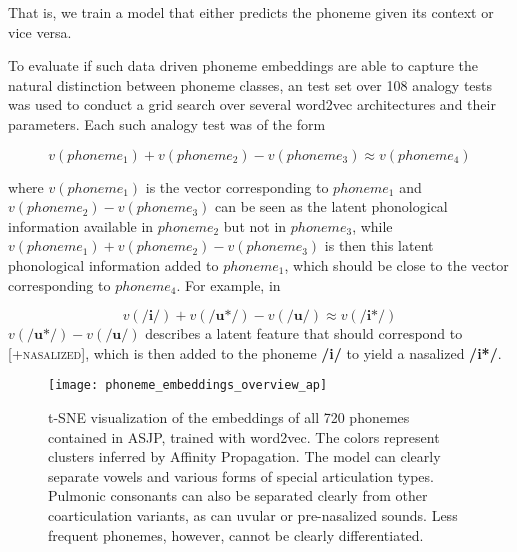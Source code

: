\documentclass[8pt]{article}
\begin{document}
That is, we train a model that either predicts the phoneme given its context or vice versa.  


To evaluate if such data driven phoneme embeddings are able to capture the natural distinction between phoneme classes, an test set over 108 analogy tests was used to conduct a grid search over several word2vec architectures and their parameters. Each such analogy test was of the form

\begin{equation}
v(phoneme_1) + v(phoneme_2) -  v(phoneme_3) \approx v(phoneme_4)
\end{equation} 

where $v(phoneme_1)$ is the vector corresponding to $phoneme_1$ and $v(phoneme_2) - v(phoneme_3)$ can be seen as the latent phonological information available in $phoneme_2$ but not in $phoneme_3$,  while $v(phoneme_1) + v(phoneme_2) -  v(phoneme_3) $ is then this latent phonological information added to $phoneme_1$, which should be close to the vector corresponding to $phoneme_4$. For example, in

\begin{equation}
v(\textbf{/i/} ) + v(\textbf{/u*/} ) -  v(\textbf{/u/} ) \approx v(\textbf{/i*/} )
\end{equation}
$v(\textbf{/u*/} ) -  v(\textbf{/u/} )$ describes a latent feature that should correspond to \textsc{[+nasalized]}, which is then added to the phoneme \textbf{/i/} to yield a nasalized \textbf{/i*/}.

\begin{figure}[h]
\begin{center}
\texttt{[image: phoneme\_embeddings\_overview\_ap]} 
\caption{t-SNE visualization of the embeddings of all 720 phonemes contained in ASJP, trained with word2vec. The colors represent clusters inferred by Affinity Propagation. The model can clearly separate vowels and various forms of special articulation types. Pulmonic consonants can also be separated clearly from other coarticulation variants, as can uvular or pre-nasalized sounds. Less frequent phonemes, however, cannot be clearly differentiated. }
\label{default}
\end{center}
\end{figure}
\end{document}
